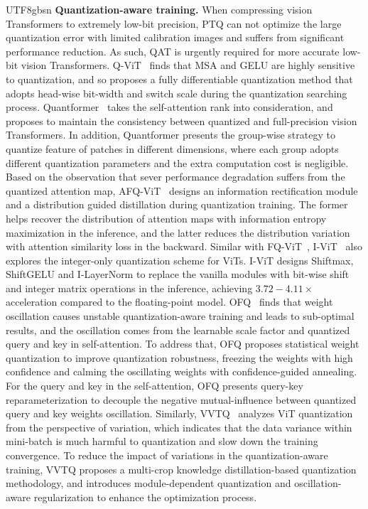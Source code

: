 \documentclass[10pt,journal,compsoc]{IEEEtran}
\newcommand{\<}{\left\langle}
\renewcommand{\>}{\right\rangle}
\newcommand{\1}{\mathbbm{1}}
\begin{document}
\begin{CJK}{UTF8}{gbsn}
\noindent \textbf{Quantization-aware training.}  When compressing vision Transformers to extremely low-bit precision, PTQ can not optimize the large quantization error with limited calibration images and suffers from significant performance reduction. As such, QAT is urgently required for more accurate low-bit vision Transformers. 
Q-ViT~\cite{li2022q_diff} finds that MSA and GELU are highly sensitive to quantization, and so proposes a fully differentiable quantization method that adopts head-wise bit-width and switch scale during the quantization searching process.
Quantformer~\cite{wang2022quantformer} takes the self-attention rank into consideration, and proposes to maintain the consistency between quantized and full-precision vision Transformers. In addition, Quantformer presents the group-wise strategy to quantize feature of patches in different dimensions, where each group adopts different quantization parameters and the extra computation cost is negligible.
Based on the observation that sever performance degradation suffers from the quantized attention map, AFQ-ViT~\cite{li2022q} designs an information rectification module and a distribution guided distillation during quantization training. The former helps recover the distribution of attention maps with information entropy maximization in the inference, and the latter reduces the distribution variation with attention similarity loss in the backward. Similar with FQ-ViT~\cite{lin2021fq}, I-ViT~\cite{li2023vit} also explores the integer-only quantization scheme for ViTs. I-ViT designs Shiftmax, ShiftGELU and I-LayerNorm to replace the vanilla modules with bit-wise shift and integer matrix operations in the inference, achieving $3.72-4.11\times$ acceleration compared to the floating-point model. OFQ~\cite{liu2023oscillation} finds that weight oscillation causes unstable quantization-aware training and leads to sub-optimal results, and the oscillation comes from the learnable scale factor and quantized query and key in self-attention. To address that, OFQ proposes statistical weight quantization to improve quantization robustness, freezing the weights with high confidence and calming the oscillating weights with confidence-guided annealing. For the query and key in the self-attention, OFQ presents query-key reparameterization to decouple the negative mutual-influence between quantized query and key weights oscillation. Similarly, VVTQ~\cite{huang2023variation} analyzes ViT quantization from the perspective of variation, which indicates that the data variance within mini-batch is much harmful to quantization and slow down the training convergence. To reduce the impact of variations in the quantization-aware training, VVTQ proposes a multi-crop knowledge distillation-based quantization methodology, and introduces module-dependent quantization and oscillation-aware regularization to enhance the optimization process.



\end{CJK}
\end{document}
